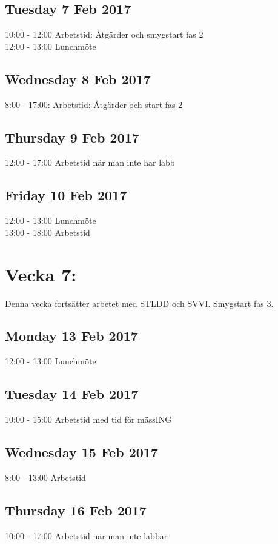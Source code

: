 \documentclass[paper=a4, fontsize=11pt,twoside]{article}
\begin{document}
\subsection*{Tuesday 7 Feb 2017}
	10:00 - 12:00 Arbetstid: Åtgärder och smygstart fas 2\\
	12:00 - 13:00 Lunchmöte\\
\subsection*{Wednesday 8 Feb 2017}
	8:00 - 17:00: Arbetstid: Åtgärder och start fas 2\\
\subsection*{Thursday 9 Feb 2017}
	12:00 - 17:00 Arbetstid när man inte har labb\\
\subsection*{Friday 10 Feb 2017}
	12:00 - 13:00 Lunchmöte\\
	13:00 - 18:00 Arbetstid\\




\section*{Vecka 7:}
Denna vecka fortsätter arbetet med STLDD och SVVI. Smygstart fas 3.\\
\subsection*{Monday 13 Feb 2017}
	12:00 - 13:00 Lunchmöte\\
\subsection*{Tuesday 14 Feb 2017}
	10:00 - 15:00 Arbetstid med tid för mässING\\
\subsection*{Wednesday 15 Feb 2017}
	8:00 - 13:00 Arbetstid\\
\subsection*{Thursday 16 Feb 2017}
	10:00 - 17:00 Arbetstid när man inte labbar\\
\end{document}
